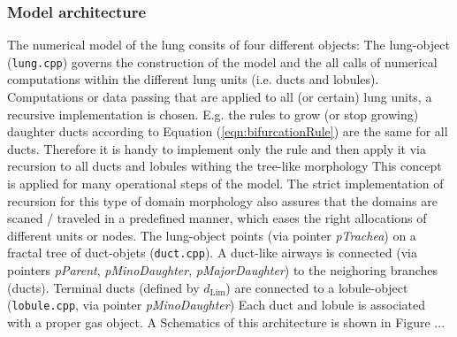 \subsubsection{Model architecture}
The numerical model of the lung consits of four different objects: The lung-object (\texttt{lung.cpp}) governs the construction of the model and the all calls of numerical computations within the different lung units (i.e. ducts and lobules).
Computations or data passing that are applied to all (or certain) lung units, a recursive implementation is chosen.
E.g. the rules to grow (or stop growing) daughter ducts according to Equation (\ref{eqn:bifurcationRule}) are the same for all ducts.
Therefore it is handy to implement only the rule and then apply it via recursion to all ducts and lobules withing the tree-like morphology
This concept is applied for many operational steps of the model.
The strict implementation of recursion for this type of domain morphology also assures that the domains are scaned / traveled in a predefined manner, which eases the right allocations of different units or nodes.
The lung-object points (via pointer \textit{pTrachea}) on a fractal tree of duct-objets (\texttt{duct.cpp}).
A duct-like airways is connected (via pointers \textit{pParent}, \textit{pMinoDaughter}, \textit{pMajorDaughter}) to the neighoring branches (ducts).
Terminal ducts (defined by $d_\mathrm{Lim}$) are connected to a lobule-object (\texttt{lobule.cpp}, via pointer \textit{pMinoDaughter})
Each duct and lobule is associated with a proper gas object.
A Schematics of this architecture is shown in Figure ...
